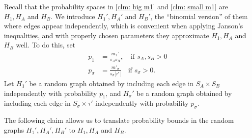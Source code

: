 \documentclass[11pt]{article}
\theoremstyle{plain}
\begin{document}
Recall that the probability spaces in \cref{clm: big m1} and \cref{clm: small m1} are $H_1, H_A$ and $H_B$. We introduce $H_1',H_A'$ and $H_B'$, the ``binomial version'' of them where edges appear independently, which is convenient when applying Janson's inequalities, and with properly chosen parameters they approximate $H_1,H_A$ and $H_B$ well.  To do this,  set 
\begin{align*}
p_1 &= \frac{m_1'}{s_As_B},\quad \text{if $s_A, s_B > 0$}\\
p_\sigma &= \frac{m'_\sigma}{s_\sigma|\tau'|}\quad \text{if $s_\sigma > 0$}.
\end{align*}
Let $H_1'$ be a random graph obtained by including each edge in $S_A \times S_B$ independently with probability $p_1$, and $H_\sigma'$ be a random graph obtained by including each edge in $S_\sigma \times \tau'$ independently with probability $p_\sigma$. 



The following claim allows us to translate probability bounds in the random graphs $H_1', H_A', H_B'$ to $H_1,H_A$ and $H_B$.

\end{document}
